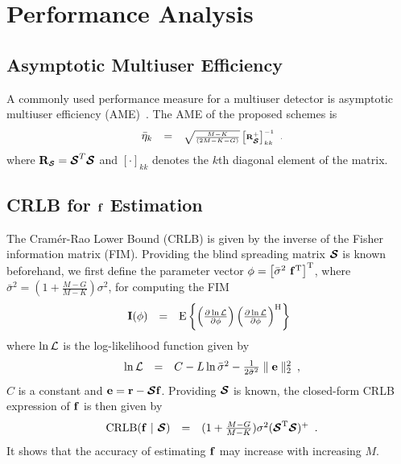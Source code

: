 \documentclass[a4paper,10pt,fleqn, twocolumn]{IEEETran}
\newcommand{\br}{{\mathbf r}}
\newcommand{\bbf}{{\bf f}}
\newcommand{\bI}{{\bf I}}
\newcommand{\bR}{{\bf R}}
\newcommand{\bcS}{{\mbox {\boldmath ${\cal S}$}}}
\begin{document}
\section{Performance Analysis}
\subsection{Asymptotic Multiuser Efficiency}
A commonly used performance measure for a multiuser detector is
asymptotic multiuser efficiency (AME)~\cite{Verd98}. The AME of
the proposed schemes is
\begin{equation}
\begin{array}{rcl}
\bar{\eta}_k&=&\sqrt{\frac{M-K}{(2M-K-G)}}\left[\bR_{\tiny\bcS}^{+}\right]_{kk}^{-1}
\end{array}.
\end{equation}
\noindent where $\bR_{\tiny\bcS}=\bcS^{T}\bcS$ and
$\left[\cdot\right]_{kk}$ denotes the $k$th diagonal element of
the matrix.
\subsection{CRLB for $\bbf$ Estimation}
The Cram\'{e}r-Rao Lower Bound (CRLB) is given by the inverse of
the Fisher information matrix (FIM). Providing the blind spreading
matrix $\bcS$ is known beforehand, we first define the parameter
vector $\mathbf{\phi} = \left[\bar{\sigma}^{2}\ \bbf^{\rm
T}\right]^{\rm T}$, where $\bar{\sigma}^{2}
=(1+\frac{M-G}{M-K})\sigma^{2}$, for computing the FIM
\begin{equation}
\begin{array}{rcl}
{\bI(\mathbf{\phi})} &=& {\rm E} \left\{ \left( \frac{\partial
\ln{\cal L}}{\partial \mathbf{\phi}} \right) \left( \frac{\partial
\ln{\cal L}}{\partial \mathbf{\phi}} \right)^{\rm H} \right\}
\label{fim}
\end{array}
\end{equation}
\noindent where $\ln{\cal L}$ is the log-likelihood function given
by
\begin{equation}
\begin{array}{rcl}
\ln{\cal
L}&=&C-L\ln\bar{\sigma}^2-\frac{1}{2\bar{\sigma}^2}\parallel\mathbf{e}\parallel_2^2
\end{array},\label{logl}
\end{equation}
\noindent $C$ is a constant and $\mathbf{e}=\br-\bcS\bbf$.
Providing $\bcS$ is known, the closed-form CRLB expression of
$\bbf$ is then given by
\begin{equation}
\begin{array}{rcl}
{\rm CRLB}(\bbf\ |\ \bcS) &
=&(1+\frac{M-G}{M-K})\sigma^{2}(\bcS^{\rm T}\bcS)^{\rm +}
\end{array}.\label{CRLB_f}
\end{equation}
\noindent It shows that the accuracy of estimating $\bbf$ may
increase with increasing $M$.
\end{document}

